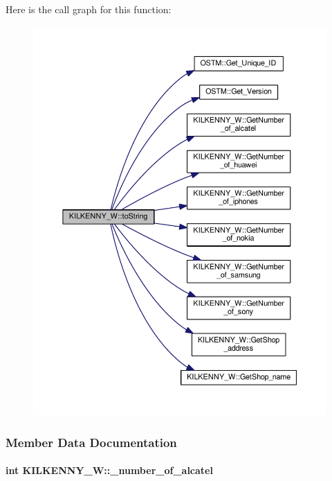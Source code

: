 Here is the call graph for this function\+:\nopagebreak
\begin{figure}[H]
\begin{center}
\leavevmode
\includegraphics[width=350pt]{class_k_i_l_k_e_n_n_y___w_aea627b4c0efd0f725363556afe1ad849_aea627b4c0efd0f725363556afe1ad849_cgraph}
\end{center}
\end{figure}




\subsubsection{Member Data Documentation}
\paragraph[{\texorpdfstring{\+\_\+number\+\_\+of\+\_\+alcatel}{_number_of_alcatel}}]{\setlength{\rightskip}{0pt plus 5cm}int K\+I\+L\+K\+E\+N\+N\+Y\+\_\+\+W\+::\+\_\+number\+\_\+of\+\_\+alcatel\hspace{0.3cm}{\ttfamily [private]}}\hypertarget{class_k_i_l_k_e_n_n_y___w_ab1523ca2daf22c518edb3be585485b16_ab1523ca2daf22c518edb3be585485b16}{}\label{class_k_i_l_k_e_n_n_y___w_ab1523ca2daf22c518edb3be585485b16_ab1523ca2daf22c518edb3be585485b16}


